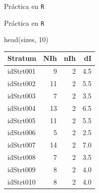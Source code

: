 \documentclass[
  english,
  ignorenonframetext,
]{beamer}
\newenvironment{Shaded}{\begin{snugshade}}{\end{snugshade}}
\newcommand{\AttributeTok}[1]{\textcolor[rgb]{0.77,0.63,0.00}{#1}}
\newcommand{\DecValTok}[1]{\textcolor[rgb]{0.00,0.00,0.81}{#1}}
\newcommand{\FunctionTok}[1]{\textcolor[rgb]{0.00,0.00,0.00}{#1}}
\newcommand{\NormalTok}[1]{#1}
\newcommand{\OtherTok}[1]{\textcolor[rgb]{0.56,0.35,0.01}{#1}}
\newcommand{\SpecialCharTok}[1]{\textcolor[rgb]{0.00,0.00,0.00}{#1}}
\begin{document}
\begin{frame}[fragile]{Práctica en \texttt{R}}
\protect\hypertarget{pruxe1ctica-en-r-2}{}
\begin{Shaded}
\end{Shaded}
\end{frame}

\begin{frame}[fragile]{Práctica en \texttt{R}}
\protect\hypertarget{pruxe1ctica-en-r-3}{}
\begin{Shaded}
\begin{Highlighting}[]
\FunctionTok{head}\NormalTok{(sizes, }\DecValTok{10}\NormalTok{)}
\end{Highlighting}
\end{Shaded}

\begin{longtable}[]{@{}lrrr@{}}
\toprule
Stratum & NIh & nIh & dI \\
\midrule
\endhead
idStrt001 & 9 & 2 & 4.5 \\
idStrt002 & 11 & 2 & 5.5 \\
idStrt003 & 7 & 2 & 3.5 \\
idStrt004 & 13 & 2 & 6.5 \\
idStrt005 & 11 & 2 & 5.5 \\
idStrt006 & 5 & 2 & 2.5 \\
idStrt007 & 14 & 2 & 7.0 \\
idStrt008 & 7 & 2 & 3.5 \\
idStrt009 & 8 & 2 & 4.0 \\
idStrt010 & 8 & 2 & 4.0 \\
\bottomrule
\end{longtable}
\end{frame}
\end{document}
